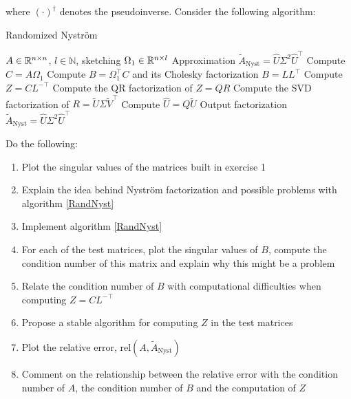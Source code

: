 \documentclass[11pt]{article}
\begin{document}
where $(\cdot)^{\dagger}$ denotes the pseudoinverse. Consider the following algorithm:

\scriptsize
\begin{algorithm}
\caption{Randomized Nyström}\label{RandNyst}
\begin{algorithmic}
\Input $A \in \mathbb{R}^{n \times n}$, $l \in \mathbb{N}$, sketching $\Omega_1 \in \mathbb{R}^{n \times l}$
\Output Approximation $\tilde{A}_{\text{Nyst}} = \hat{U}\Sigma^2 \hat{U}^\top$
\State Compute $C = A\Omega_1$
\State Compute $B = \Omega_1^\top C$ and its Cholesky factorization $B = LL^\top$
\State Compute $Z = CL^{-\top}$
\State Compute the QR factorization of $Z = QR$
\State Compute the SVD factorization of $R = \tilde{U}\Sigma \tilde{V}^{\top}$
\State Compute $\hat{U} = Q\tilde{U}$
\State Output factorization $\tilde{A}_{\text{Nyst}} = \hat{U}\Sigma^2 \hat{U}^\top$
\end{algorithmic}
\end{algorithm}
\normalsize

Do the following:

\begin{enumerate}
    \item Plot the singular values of the matrices built in exercise 1
    \item Explain the idea behind Nyström factorization and possible problems with algorithm \ref{RandNyst}
    \item Implement algorithm \ref{RandNyst}
    \item For each of the test matrices, plot the singular values of $B$, compute the condition number of this matrix and explain why this might be a problem
    \item Relate the condition number of $B$ with computational difficulties when computing $Z = CL^{-\top}$
    \item Propose a stable algorithm for computing $Z$ in the test matrices
    \item Plot the relative error, $\text{rel}(A, \tilde{A}_{\text{Nyst}})$
    \item Comment on the relationship between the relative error with the condition number of $A$, the condition number of $B$ and the computation of $Z$
\end{enumerate}



\end{document}
